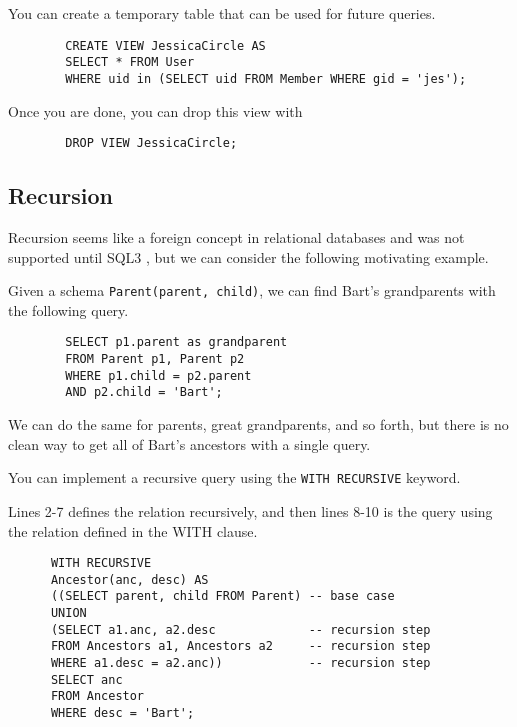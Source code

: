     \begin{example}
      You can create a temporary table that can be used for future queries. 
      \begin{lstlisting}
        CREATE VIEW JessicaCircle AS 
        SELECT * FROM User 
        WHERE uid in (SELECT uid FROM Member WHERE gid = 'jes'); 
      \end{lstlisting}
      Once you are done, you can drop this view with 
      \begin{lstlisting}
        DROP VIEW JessicaCircle; 
      \end{lstlisting}
    \end{example}

\subsection{Recursion} 

  Recursion seems like a foreign concept in relational databases and was not supported until SQL3 , but we can consider the following motivating example. 

  \begin{example}[Ancestors]
    Given a schema \texttt{Parent(parent, child)}, we can find Bart's grandparents with the following query. 
      \begin{lstlisting}
        SELECT p1.parent as grandparent 
        FROM Parent p1, Parent p2 
        WHERE p1.child = p2.parent 
        AND p2.child = 'Bart';
      \end{lstlisting}
      We can do the same for parents, great grandparents, and so forth, but there is no clean way to get all of Bart's ancestors with a single query.  
  \end{example} 

  \begin{definition}[Recursion]
    You can implement a recursive query using the \texttt{WITH RECURSIVE} keyword. 
  \end{definition}

  \begin{example}
    Lines 2-7 defines the relation recursively, and then lines 8-10 is the query using the relation defined in the WITH clause. 
    \begin{lstlisting}
      WITH RECURSIVE 
      Ancestor(anc, desc) AS 
      ((SELECT parent, child FROM Parent) -- base case
      UNION 
      (SELECT a1.anc, a2.desc             -- recursion step
      FROM Ancestors a1, Ancestors a2     -- recursion step
      WHERE a1.desc = a2.anc))            -- recursion step
      SELECT anc 
      FROM Ancestor 
      WHERE desc = 'Bart'; 
    \end{lstlisting}
  \end{example}

